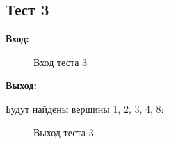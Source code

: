 \documentclass[a4paper]{article}
\begin{document}
\subsection{Тест 3}

\textbf{Вход:}
  \begin{figure}[!h]
    \caption{Вход теста 3}
  \end{figure}
\par
\textbf{Выход:} \par
  Будут найдены вершины 1, 2, 3, 4, 8:
  \begin{figure}[!h]
    \caption{Выход теста 3}
  \end{figure}
\newpage
\end{document}
